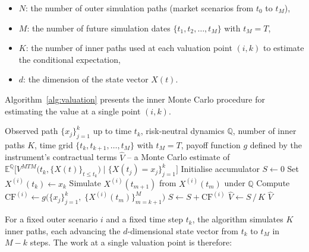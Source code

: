 \begin{itemize}
      \item $N$: the number of outer simulation paths (market scenarios from $t_0$ to $t_M$),
      \item $M$: the number of future simulation dates $\{t_1, t_2, \dots, t_M\}$ with $t_M = T$,
      \item $K$: the number of inner paths used at each valuation point $(i, k)$ to estimate the conditional expectation,
      \item $d$: the dimension of the state vector $X(t)$.
  \end{itemize}

  \newpage
  \caption{Estimation of $V(t_k, \{X(t_j)\}_{j=1}^{k})$}                                                               \noindent
  Algorithm~\ref{alg:valuation} presents the inner Monte Carlo procedure for estimating the value at a single point $(i, k)$.

  \begin{algorithm}
  \caption{Estimation of $V(t_k, \{X(t_j)\}_{j=1}^{k})$ at a fixed outer scenario $i$ and time step $t_k$}
  \label{alg:valuation}
  \begin{algorithmic}[1]
      \Require Observed path $\{x_j\}_{j=1}^{k}$ up to time $t_k$, risk-neutral dynamics $\mathbb{Q}$, number of inner paths $K$, time grid $\{t_k, t_{k+1}, \ldots, t_M\}$ with $t_M = T$,
  payoff function $g$ defined by the instrument's contractual terms
      \Ensure $\hat{V}$ -- a Monte Carlo estimate of $\mathbb{E}^{\mathbb{Q}}\!\Big[ V^{MTM}\!\big(t_k, \{X(t)\}_{t \leq t_k}\big) \;\Big|\; \{X(t_j) = x_j\}_{j=1}^{k} \Big]$
      \State Initialise accumulator $S \leftarrow 0$
          \State Set $X^{(i)}(t_k) \leftarrow x_k$
              \State Simulate $X^{(i)}(t_{m+1})$ from $X^{(i)}(t_m)$ under $\mathbb{Q}$
          \EndFor
          \State Compute $\text{CF}^{(i)} \leftarrow g\!\Big(\{x_j\}_{j=1}^{k},\; \{X^{(i)}(t_m)\}_{m=k+1}^{M}\Big)$
          \State $S \leftarrow S + \text{CF}^{(i)}$
      \EndFor
      \State $\hat{V} \leftarrow S \,/\, K$
      \State \Return $\hat{V}$
  \end{algorithmic}
  \end{algorithm}
  \noindent
  For a fixed outer scenario $i$ and a fixed time step $t_k$, the algorithm simulates $K$ inner paths, each advancing the $d$-dimensional state vector from $t_k$ to $t_M$ in $M - k$ steps.
  The work at a single valuation point is therefore:

